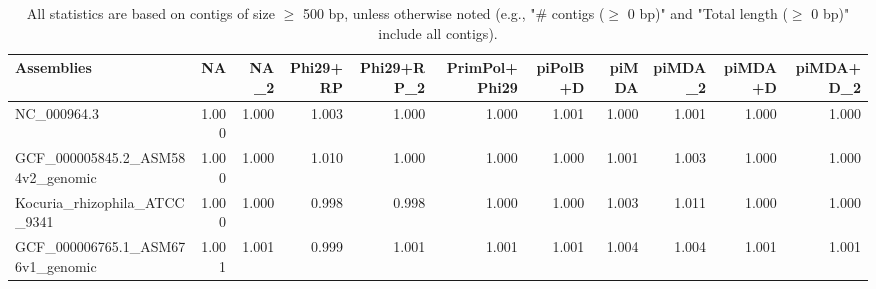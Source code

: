 \documentclass[12pt,a4paper]{article}
\begin{document}
\begin{table}[ht]
\begin{center}
\caption{All statistics are based on contigs of size $\geq$ 500 bp, unless otherwise noted (e.g., "\# contigs ($\geq$ 0 bp)" and "Total length ($\geq$ 0 bp)" include all contigs).}
\begin{tabular}{|l*{10}{|r}|}
\hline
Assemblies & NA & NA\_2 & Phi29+RP & Phi29+RP\_2 & PrimPol+Phi29 & piPolB+D & piMDA & piMDA\_2 & piMDA+D & piMDA+D\_2 \\ \hline
NC\_000964.3 & 1.000 & 1.000 & 1.003 & 1.000 & 1.000 & 1.001 & 1.000 & 1.001 & 1.000 & 1.000 \\ \hline
GCF\_000005845.2\_ASM584v2\_genomic & 1.000 & 1.000 & 1.010 & 1.000 & 1.000 & 1.000 & 1.001 & 1.003 & 1.000 & 1.000 \\ \hline
Kocuria\_rhizophila\_ATCC\_9341 & 1.000 & 1.000 & 0.998 & 0.998 & 1.000 & 1.000 & 1.003 & 1.011 & 1.000 & 1.000 \\ \hline
GCF\_000006765.1\_ASM676v1\_genomic & 1.001 & 1.001 & 0.999 & 1.001 & 1.001 & 1.001 & 1.004 & 1.004 & 1.001 & 1.001 \\ \hline
\end{tabular}
\end{center}
\end{table}
\end{document}

